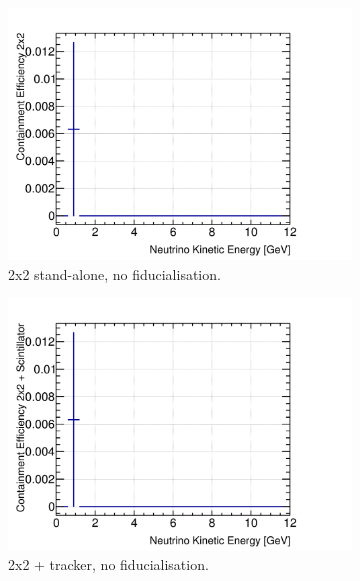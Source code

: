 \documentclass[10pt,a4paper,openany]{article}
\begin{document}
\begin{figure}[!htb]
	\centering
	\begin{subfigure}[b]{0.49\textwidth}
		\centering
		\includegraphics[width=1.0\textwidth]{E_cont_eff_2x2.png}
		\caption{2x2 stand-alone, no fiducialisation.}
		\label{}
	\end{subfigure}	
	\hfill
	\begin{subfigure}[b]{0.49\textwidth}
		\centering
		\includegraphics[width=1.0\textwidth]{E_cont_eff_2x2_Scintillator_gap.png}
		\caption{2x2 + tracker, no fiducialisation.}
		\label{}
	\end{subfigure}	
	\begin{subfigure}[b]{0.49\textwidth}
		\centering

\end{subfigure}
\end{figure}
\end{document}
